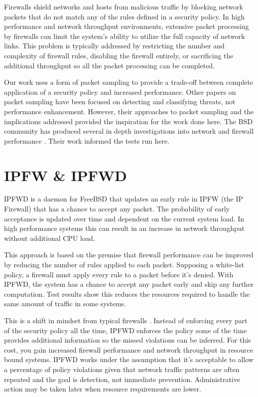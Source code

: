 \documentclass[journal]{IEEEtran}
\begin{document}
  Firewalls shield networks and hosts from malicious traffic by blocking
  network packets that do not match any of the rules defined in a security
  policy. In high performance and network throughput environments, extensive
  packet processing by firewalls can limit the system's ability to utilize the
  full capacity of network links. This problem is typically addressed by
  restricting the number and complexity of firewall rules, disabling the
  firewall entirely, or sacrificing the additional throughput so all the packet
  processing can be completed.

  Our work uses a form of packet sampling to provide a trade-off between
  complete application of a security policy and increased performance.  Other
  papers \cite{exploitingpacketsampling, analysisnetflow,
  monitoringpacketsampling} on packet sampling have been focused on detecting
  and classifying threats, not performance enhancement. However, their
  approaches to packet sampling and the implications addressed provided the
  inspiration for the work done here. The BSD community has produced several in
  depth investigations into network and firewall performance
  \cite{ipfwvspf,optimizingfreebsd}. Their work informed the tests run here.


\section{IPFW \& IPFWD}

  IPFWD is a daemon for FreeBSD that updates an early rule in IPFW (the IP
  Firewall) that has a chance to accept any packet. The probability of early
  acceptance is updated over time and dependent on the current system load. In
  high performance systems this can result in an increase in network
  throughput without additional CPU load.

  This approach is based on the premise that firewall performance can be
  improved by reducing the number of rules applied to each packet. Supposing a
  white-list policy, a firewall must apply every rule to a packet before
  it's denied.  With IPFWD, the system has a chance to accept any packet early
  and skip any further computation. Test results show this reduces the 
  resources required to handle the same amount of traffic in some systems.

  This is a shift in mindset from typical firewalls \cite{networksecurity}.
  Instead of enforcing every part of the security policy all the time, IPFWD
  enforces the policy some of the time provides additional information so the
  missed violations can be inferred. For this cost, you gain increased firewall
  performance and network throughput in resource bound systems. IPFWD works
  under the assumption that it's acceptable to allow a percentage of policy
  violations given that network traffic patterns are often repeated and the
  goal is detection, not immediate prevention. Administrative action may be
  taken later when resource requirements are lower.
\end{document}
